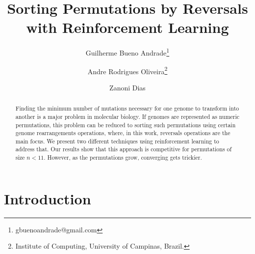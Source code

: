 \documentclass[11pt,twoside]{article}
\begin{document}


%



\TRMakeCover

\pagestyle{myheadings}

\title{Sorting Permutations by Reversals\\ with Reinforcement Learning}

\newcommand*\samethanks[1][\value{footnote}]{\footnotemark[#1]}
\author{Guilherme Bueno Andrade\thanks{gbuenoandrade@gmail.com} \and
Andre Rodrigues Oliveira\thanks{Institute of Computing, University of Campinas, Brazil.} \and Zanoni Dias\samethanks}

\date{}

\maketitle


\begin{abstract} 

Finding the minimum number of mutations necessary for one genome to transform into another is a major problem in molecular biology. If genomes are represented as numeric permutations, this problem can be reduced to sorting such permutations using certain genome rearrangements operations, where, in this work, reversals operations are the main focus. We present two different techniques using reinforcement learning to address that. Our results show that this approach is competitive for permutations of size $n < 11$. However, as the permutations grow, converging gets trickier.

\end{abstract}

\section{Introduction}
\end{document}
